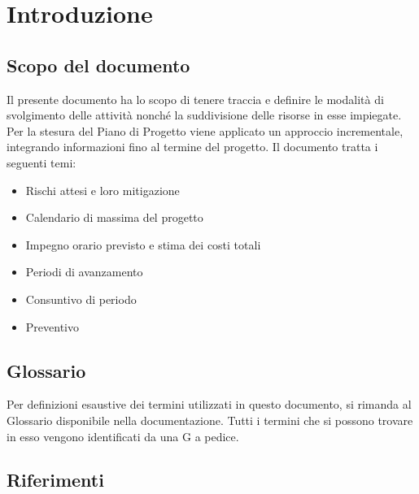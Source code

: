 \documentclass[a4paper,12pt]{article}
\begin{document}
\newpage
\tableofcontents

\newpage
\listoffigures

\newpage
\listoftables

\newpage

\section{Introduzione}
    \subsection{Scopo del documento}
        Il presente documento ha lo scopo di tenere traccia e definire le modalità di svolgimento delle attività nonché la suddivisione delle risorse in esse impiegate.
        Per la stesura del Piano di Progetto viene applicato un approccio incrementale, integrando informazioni fino al termine del progetto. Il documento tratta i seguenti temi:
        \begin{itemize}
            \item Rischi attesi e loro mitigazione
            \item Calendario di massima del progetto
            \item Impegno orario previsto e stima dei costi totali
            \item Periodi di avanzamento
            \item Consuntivo di periodo
            \item Preventivo
        \end{itemize}
    \subsection{Glossario}
        Per definizioni esaustive dei termini utilizzati in questo documento, si rimanda al Glossario disponibile nella documentazione. Tutti i termini che si possono trovare in esso vengono identificati da una G a pedice.
    \subsection{Riferimenti}
\end{document}
